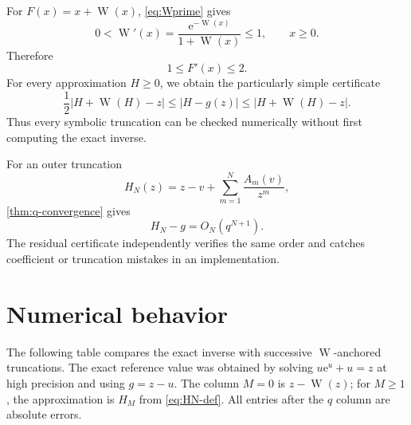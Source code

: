 \documentclass[11pt,oneside]{article}
\theoremstyle{plain}
\theoremstyle{definition}
\theoremstyle{remark}
\newcommand{\W}{\operatorname{W}}
\newcommand{\e}{\mathrm{e}}
\begin{document}
For \(F(x)=x+\W(x)\), \eqref{eq:Wprime} gives
\begin{equation}
 0<\W'(x)=\frac{\e^{-\W(x)}}{1+\W(x)}\le1,
 \qquad x\ge0.
 \label{eq:Wprime-bound}
\end{equation}
Therefore
\begin{equation}
 1\le F'(x)\le2.
 \label{eq:Fprime-bound}
\end{equation}
For every approximation \(H\ge0\), we obtain the particularly simple
certificate
\begin{equation}
 \boxed{
 \frac12|H+\W(H)-z|
 \le |H-g(z)|
 \le |H+\W(H)-z|.}
 \label{eq:special-residual-certificate}
\end{equation}
Thus every symbolic truncation can be checked numerically without first
computing the exact inverse.

For an outer truncation
\begin{equation}
 H_N(z)=z-v+\sum_{m=1}^{N}\frac{A_m(v)}{z^m},
 \label{eq:HN-def}
\end{equation}
\cref{thm:q-convergence} gives
\begin{equation}
 H_N-g=O_N(q^{N+1}).
 \label{eq:HN-error}
\end{equation}
The residual certificate independently verifies the same order and catches
coefficient or truncation mistakes in an implementation.

\section{Numerical behavior}
\label{sec:numerics}

The following table compares the exact inverse with successive
\(\W\)-anchored truncations.  The exact reference value was obtained by solving
\(u\e^u+u=z\) at high precision and using \(g=z-u\).  The column \(M=0\) is
\(z-\W(z)\); for \(M\ge1\), the approximation is \(H_M\) from
\eqref{eq:HN-def}.  All entries after the \(q\) column are absolute errors.
\end{document}
